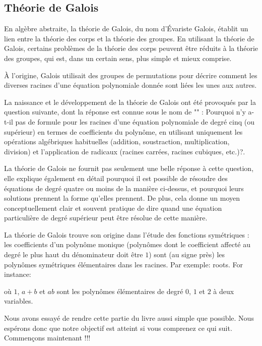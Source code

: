 	\subsection{Théorie de Galois}\label{galois theory}
	En algèbre abstraite, la théorie de Galois, du nom d'Évariste Galois, établit un lien entre la théorie des corps et la théorie des groupes. En utilisant la théorie de Galois, certains problèmes de la théorie des corps peuvent être réduits à la théorie des groupes, qui est, dans un certain sens, plus simple et mieux comprise.
	
	À l'origine, Galois utilisait des groupes de permutations pour décrire comment les diverses racines d'une équation polynomiale donnée sont liées les unes aux autres.
	
	La naissance et le développement de la théorie de Galois ont été provoqués par la question suivante, dont la réponse est connue sous le nom de "" : Pourquoi n'y a-t-il pas de formule pour les racines d'une équation polynomiale de degré cinq (ou supérieur) en termes de coefficients du polynôme, en utilisant uniquement les opérations algébriques habituelles (addition, soustraction, multiplication, division) et l'application de radicaux (racines carrées, racines cubiques, etc.)?.
	
	La théorie de Galois ne fournit pas seulement une belle réponse à cette question, elle explique également en détail pourquoi il est possible de résoudre des équations de degré quatre ou moins de la manière ci-dessus, et pourquoi leurs solutions prennent la forme qu'elles prennent. De plus, cela donne un moyen conceptuellement clair et souvent pratique de dire quand une équation particulière de degré supérieur peut être résolue de cette manière.
	
	La théorie de Galois trouve son origine dans l'étude des fonctions symétriques : les coefficients d'un polynôme monique (polynômes dont le coefficient affecté au degré le plus haut du dénominateur doit être $1$) sont (au signe près) les polynômes symétriques élémentaires dans les racines. Par exemple: roots. For instance:
	
 	où $1$, $a + b$ et $ab$ sont les polynômes élémentaires de degré $0$, $1$ et $2$ à deux variables.
 	
 	Nous avons essayé de rendre cette partie du livre aussi simple que possible. Nous espérons donc que notre objectif est atteint si vous comprenez ce qui suit. Commençons maintenant !!!
 	
